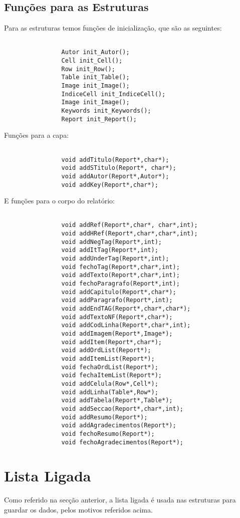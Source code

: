 \documentclass[11pt, a4paper]{report}
\begin{document}
\subsection{Funções para as Estruturas}
Para as estruturas temos funções de inicialização, que são as seguintes:\\
\begin{verbatim}

				Autor init_Autor();
				Cell init_Cell();
				Row init_Row();
				Table init_Table();
				Image init_Image();
				IndiceCell init_IndiceCell();
				Image init_Image();
				Keywords init_Keywords();
				Report init_Report();
			\end{verbatim}
Funções para a capa:\\
\begin{verbatim}

				void addTitulo(Report*,char*);
				void addSTitulo(Report*, char*);
				void addAutor(Report*,Autor*);
				void addKey(Report*,char*);
			\end{verbatim}
E funções para o corpo do relatório:\\
\begin{verbatim}

				void addRef(Report*,char*, char*,int);
				void addHRef(Report*,char*,char*,int);
				void addNegTag(Report*,int);
				void addItTag(Report*,int);
				void addUnderTag(Report*,int);
				void fechoTag(Report*,char*,int);
				void addTexto(Report*,char*,int);
				void fechoParagrafo(Report*,int);
				void addCapitulo(Report*,char*);
				void addParagrafo(Report*,int);
				void addEndTAG(Report*,char*,char*);
				void addTextoNF(Report*,char*);
				void addCodLinha(Report*,char*,int);
				void addImagem(Report*,Image*);
				void addItem(Report*,char*);
				void addOrdList(Report*);
				void addItemList(Report*);
				void fechaOrdList(Report*);
				void fechaItemList(Report*);
				void addCelula(Row*,Cell*);
				void addLinha(Table*,Row*);
				void addTabela(Report*,Table*);
				void addSeccao(Report*,char*,int);
				void addResumo(Report*);
				void addAgradecimentos(Report*);
				void fechoResumo(Report*);
				void fechoAgradecimentos(Report*);
			\end{verbatim}
\section{Lista Ligada}
Como referido na secção anterior, a lista ligada é usada nas estruturas para guardar os dados, pelos motivos referidos acima.\\
\end{document}
